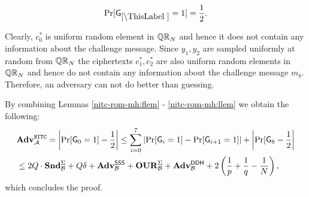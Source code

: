 \begin{lemma}\label{nitc-rom-mh:llem}
\[
\Pr[\games_\thisgame = 1] = \half.
\]
\end{lemma}

Clearly, $c_0^*$ is uniform random element in $\mathbb{QR}_N$ and hence it does not contain any information about the challenge message. Since $y_1, y_2$ are sampled uniformly at random from $\mathbb{QR}_N$ the ciphertexts $c_1^*, c_2^*$ are also uniform random elements in $\mathbb{QR}_N$ and hence do not contain any information about the challenge message $m_b$. Therefore, an adversary can not do better than guessing.

By combining Lemmas \ref{nitc-rom-mh:flem} - \ref{nitc-rom-mh:llem} we obtain the following:
\begin{align*}
&\mathbf{Adv}^{\mathtt{NITC}}_{\mathcal{A}} = \left| \Pr[\mathsf{G}_0 = 1] - \frac{1}{2} \right| \leq \sum_{i=0}^7 \left|\Pr[\mathsf{G}_i = 1] - \Pr[\mathsf{G}_{i+1} = 1] \right| + \left|\Pr[\mathsf{G}_{8}- \frac{1}{2}\right| \\
 &\leq 2Q \cdot \mathbf{Snd}^\Sigma_{\mathcal{B}} + Q\delta + \mathbf{Adv}^{\mathsf{SSS}}_{\mathcal{B}} + \mathbf{OUR}^\Sigma_{\mathcal{B}} + \mathbf{Adv}^{\mathsf{DDH}}_{\mathcal{B}} + 2 \left( \frac{1}{p}+\frac{1}{q}-\frac{1}{N} \right),
\end{align*}
which concludes the proof.



